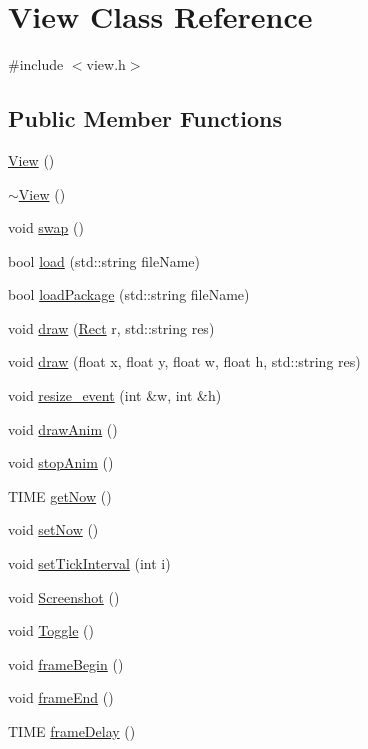 \hypertarget{class_view}{\section{View Class Reference}
\label{class_view}
}


{\ttfamily \#include $<$view.\-h$>$}

\subsection*{Public Member Functions}
\begin{DoxyCompactItemize}
\item 
\hyperlink{class_view_a44ad60a768422d3fa8fbd7576950080a}{View} ()
\item 
\hyperlink{class_view_ad0dc854db9aabbea98a334dec89f785c}{$\sim$\-View} ()
\item 
void \hyperlink{class_view_ac0b7ffdb316f54013052928c6e2e8ace}{swap} ()
\item 
bool \hyperlink{class_view_a2c7a00026247246c1f4b7b18b1cec20e}{load} (std\-::string file\-Name)
\item 
bool \hyperlink{class_view_a6edea19c9c4efd1a088d2ebbfbd3a240}{load\-Package} (std\-::string file\-Name)
\item 
void \hyperlink{class_view_a133f5487097d796a1b276f8c14f0671c}{draw} (\hyperlink{struct_rect}{Rect} r, std\-::string res)
\item 
void \hyperlink{class_view_a2a474840a5d346723e37dd01fd248e4e}{draw} (float x, float y, float w, float h, std\-::string res)
\item 
void \hyperlink{class_view_ab756d944d5d8a45c1ce6b365e6b6c27c}{resize\-\_\-event} (int \&w, int \&h)
\item 
void \hyperlink{class_view_a81b5809859fda85f39e0faa1b169e6d5}{draw\-Anim} ()
\item 
void \hyperlink{class_view_a067c5cbb6e248ae041c13d50da48d699}{stop\-Anim} ()
\item 
T\-I\-M\-E \hyperlink{class_view_a9cb2b63e68cff08050892f8d43909bf9}{get\-Now} ()
\item 
void \hyperlink{class_view_a33aeee3fb2659af067d1a279a2d96ed7}{set\-Now} ()
\item 
void \hyperlink{class_view_a51b9f1d6901753f868242ab9b3334dce}{set\-Tick\-Interval} (int i)
\item 
void \hyperlink{class_view_a2299069ba34803c1da65e0b43b6d7f10}{Screenshot} ()
\item 
void \hyperlink{class_view_a3f1c78cf35fbbed0019e9b835a118f19}{Toggle} ()
\item 
void \hyperlink{class_view_a62c7ef62ba7a4dab206a81ff999a2978}{frame\-Begin} ()
\item 
void \hyperlink{class_view_ac63fd1ddfcfb68d11f3a039ae8537765}{frame\-End} ()
\item 
T\-I\-M\-E \hyperlink{class_view_a911928e6ed1a440eafe321f2aab1c3e0}{frame\-Delay} ()
\end{DoxyCompactItemize}



